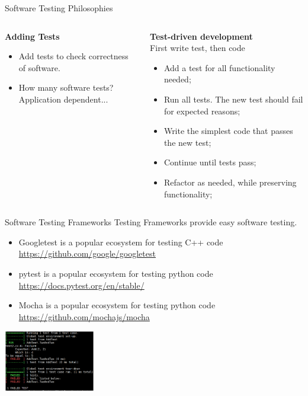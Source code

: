 \documentclass{setbeamer}
\begin{document}
\begin{frame}{Software Testing Philosophies}

\vspace{1cm}

	\begin{columns}[T]
        \begin{column}{0.5\textwidth}
            \textbf{Adding Tests}\\
            \begin{itemize}
            	\item 
            	Add tests to check correctness of software.
            	\item
            	How many software tests? Application dependent...
            \end{itemize}
        \end{column}
        \begin{column}{0.5\textwidth}
            \textbf{Test-driven development}\\
            First write test, then code
            \begin{itemize}
            	\item 
            	Add a test for all functionality needed;
            	\item
            	Run all tests. The new test should fail for expected reasons;
            	\item
            	Write the simplest code that passes the new test;
            	\item 
            	Continue until tests pass;
            	\item
            	Refactor as needed, while preserving functionality;
            \end{itemize}
        \end{column}
	\end{columns}
        
    
\end{frame}

\begin{frame}{Software Testing Frameworks}
\vspace{.3cm}
Testing Frameworks provide easy software testing.
\begin{itemize}
\item Googletest is a popular ecosystem for testing C++ code \url{https://github.com/google/googletest}
\item pytest is a popular ecosystem for testing python code \url{https://docs.pytest.org/en/stable/}
\item Mocha is a popular ecosystem for testing python code \url{https://github.com/mochajs/mocha}
\end{itemize}

\centering
\includegraphics[width=4cm]{resources/unittesting.png}
      
\end{frame}
\end{document}
